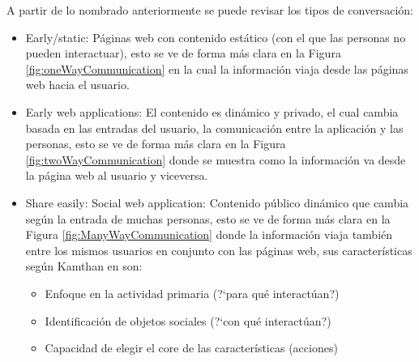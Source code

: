 \documentclass[oneside,12pt,a4paper]{memoir}%
\begin{document}
		A partir de lo nombrado anteriormente se puede revisar los tipos de
		conversaci\'on:
		\begin{itemize}
		  \item Early/static: P\'aginas web con contenido est\'atico (con el que las
		  personas no pueden interactuar), esto se ve de forma m\'as clara en
		  la Figura \ref{fig:oneWayCommunication} en la cual la
		  informaci\'on viaja desde las p\'aginas web hacia el usuario.
		  \item Early web applications: El contenido es din\'amico y privado, el cual
		  cambia basada en las entradas del usuario, la comunicaci\'on entre
		  la aplicaci\'on y las personas, esto se ve de forma m\'as clara en
		  la Figura \ref{fig:twoWayCommunication} donde se muestra como la informaci\'on
		  va desde la p\'agina web al usuario y viceversa.
		  \item Share easily: Social web application: Contenido p\'ublico din\'amico
		  que cambia seg\'un la entrada de muchas personas, esto se ve de forma m\'as
		  clara en la Figura \ref{fig:ManyWayCommunication} donde la informaci\'on
		  viaja tambi\'en entre los mismos usuarios en conjunto con las p\'aginas web,
		  sus caracter\'isticas seg\'un Kamthan en \cite{Kamthan2009} son:
		  
		  \begin{itemize}
		  	\item Enfoque en la actividad primaria (?`para qu\'e interact\'uan?)
		  	\item Identificaci\'on de objetos sociales (?`con qu\'e interact\'uan?)
		  	\item Capacidad de elegir el core de las caracter\'isticas (acciones)
		  \end{itemize}
		\end{itemize}
		
\end{document}
